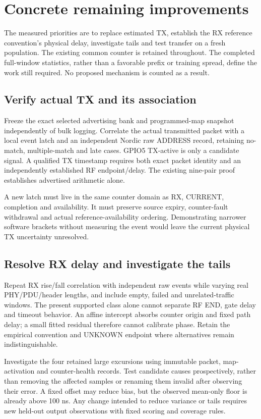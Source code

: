 \documentclass[10pt,letterpaper]{article}
\begin{document}
\section{Concrete remaining improvements}\label{sec:improvements}
The measured priorities are to replace estimated TX, establish the RX reference convention's physical delay, investigate tails and test transfer on a fresh population. The existing common counter is retained throughout. The completed full-window statistics, rather than a favorable prefix or training spread, define the work still required. No proposed mechanism is counted as a result.

\subsection{Verify actual TX and its association}
Freeze the exact selected advertising bank and programmed-map snapshot independently of bulk logging. Correlate the actual transmitted packet with a local event latch and an independent Nordic raw ADDRESS record, retaining no-match, multiple-match and late cases. GPIO5 TX-active is only a candidate signal. A qualified TX timestamp requires both exact packet identity and an independently established RF endpoint/delay. The existing nine-pair proof establishes advertised arithmetic alone.

A new latch must live in the same counter domain as RX, CURRENT, completion and availability. It must preserve source expiry, counter-fault withdrawal and actual reference-availability ordering. Demonstrating narrower software brackets without measuring the event would leave the current physical TX uncertainty unresolved.

\subsection{Resolve RX delay and investigate the tails}
Repeat RX rise/fall correlation with independent raw events while varying real PHY/PDU/header lengths, and include empty, failed and unrelated-traffic windows. The present supported class alone cannot separate RF END, gate delay and timeout behavior. An affine intercept absorbs counter origin and fixed path delay; a small fitted residual therefore cannot calibrate phase. Retain the empirical convention and UNKNOWN endpoint where alternatives remain indistinguishable.

Investigate the four retained large excursions using immutable packet, map-activation and counter-health records. Test candidate causes prospectively, rather than removing the affected samples or renaming them invalid after observing their error. A fixed offset may reduce bias, but the observed mean-only floor is already above 100 ns. Any change intended to reduce variance or tails requires new held-out output observations with fixed scoring and coverage rules.
\end{document}
